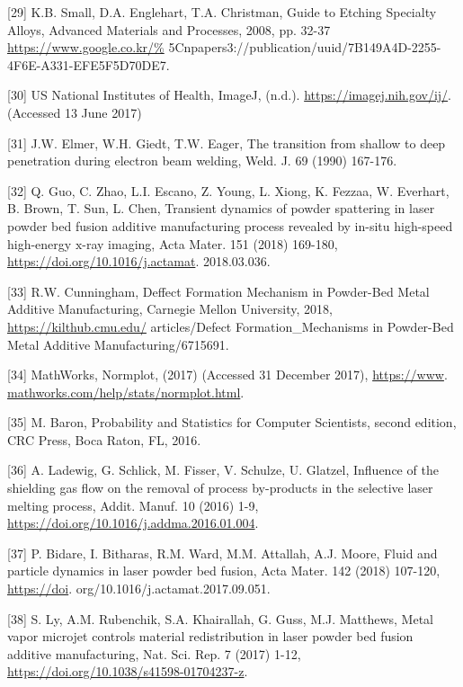 \documentclass[10pt]{article}
\begin{document}
[29] K.B. Small, D.A. Englehart, T.A. Christman, Guide to Etching Specialty Alloys, Advanced Materials and Processes, 2008, pp. 32-37 \href{https://www.google.co.kr/%25}{https://www.google.co.kr/\%} 5Cnpapers3://publication/uuid/7B149A4D-2255-4F6E-A331-EFE5F5D70DE7.

[30] US National Institutes of Health, ImageJ, (n.d.). \href{https://imagej.nih.gov/ij/}{https://imagej.nih.gov/ij/}. (Accessed 13 June 2017)

[31] J.W. Elmer, W.H. Giedt, T.W. Eager, The transition from shallow to deep penetration during electron beam welding, Weld. J. 69 (1990) 167-176.

[32] Q. Guo, C. Zhao, L.I. Escano, Z. Young, L. Xiong, K. Fezzaa, W. Everhart, B. Brown, T. Sun, L. Chen, Transient dynamics of powder spattering in laser powder bed fusion additive manufacturing process revealed by in-situ high-speed high-energy $\mathrm{x}$-ray imaging, Acta Mater. 151 (2018) 169-180, \href{https://doi.org/10.1016/j.actamat}{https://doi.org/10.1016/j.actamat}. 2018.03.036.

[33] R.W. Cunningham, Deffect Formation Mechanism in Powder-Bed Metal Additive Manufacturing, Carnegie Mellon University, 2018, \href{https://kilthub.cmu.edu/}{https://kilthub.cmu.edu/} articles/Defect Formation\_Mechanisms in Powder-Bed Metal Additive Manufacturing/6715691.

[34] MathWorks, Normplot, (2017) (Accessed 31 December 2017), \href{https://www}{https://www}. \href{http://mathworks.com/help/stats/normplot.html}{mathworks.com/help/stats/normplot.html}.

[35] M. Baron, Probability and Statistics for Computer Scientists, second edition, CRC Press, Boca Raton, FL, 2016.

[36] A. Ladewig, G. Schlick, M. Fisser, V. Schulze, U. Glatzel, Influence of the shielding gas flow on the removal of process by-products in the selective laser melting process, Addit. Manuf. 10 (2016) 1-9, \href{https://doi.org/10.1016/j.addma.2016.01.004}{https://doi.org/10.1016/j.addma.2016.01.004}.

[37] P. Bidare, I. Bitharas, R.M. Ward, M.M. Attallah, A.J. Moore, Fluid and particle dynamics in laser powder bed fusion, Acta Mater. 142 (2018) 107-120, \href{https://doi}{https://doi}. org/10.1016/j.actamat.2017.09.051.

[38] S. Ly, A.M. Rubenchik, S.A. Khairallah, G. Guss, M.J. Matthews, Metal vapor microjet controls material redistribution in laser powder bed fusion additive manufacturing, Nat. Sci. Rep. 7 (2017) 1-12, \href{https://doi.org/10.1038/s41598-01704237-z}{https://doi.org/10.1038/s41598-01704237-z}.
\end{document}
